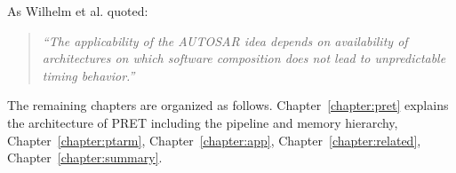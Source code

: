 As Wilhelm et al. \cite{wilhelm2009} quoted:
\begin{quote} \textit{
  ``The applicability of the AUTOSAR idea depends on availability of
  architectures on which software composition does not lead to
  unpredictable timing behavior.''
}
\end{quote}


The remaining chapters are organized as follows. 
Chapter~\ref{chapter:pret} explains the architecture of PRET including the \thdint pipeline and memory hierarchy, Chapter~\ref{chapter:ptarm}, Chapter~\ref{chapter:app}, Chapter~\ref{chapter:related}, Chapter~\ref{chapter:summary}.


